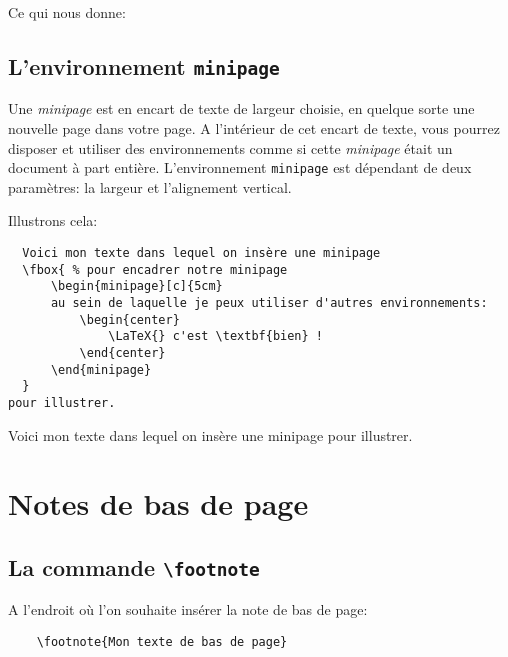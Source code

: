 Ce qui nous donne:
\begin{center}
\setlength{\fboxsep}{8mm}
\setlength{\fboxrule}{2mm}
\end{center}
\medskip

\subsection*{L'environnement \texttt{minipage}}
Une \textit{minipage} est en encart de texte de largeur choisie, en quelque sorte une nouvelle page dans votre page. A l'intérieur de cet encart de texte, vous pourrez disposer et utiliser des environnements comme si cette \textit{minipage} était un document à part entière. L'environnement \texttt{minipage} est dépendant de deux paramètres: la largeur et l'alignement vertical.
\medskip

Illustrons cela:
\begin{verbatim}
  Voici mon texte dans lequel on insère une minipage
  \fbox{ % pour encadrer notre minipage
	  \begin{minipage}[c]{5cm}
	  au sein de laquelle je peux utiliser d'autres environnements:
		  \begin{center}
			  \LaTeX{} c'est \textbf{bien} !
		  \end{center}
	  \end{minipage}
  }
pour illustrer.
\end{verbatim}
\medskip

Voici mon texte dans lequel on insère une minipage
pour illustrer.
\medskip

\section{Notes de bas de page}
\subsection*{La commande \texttt{\textbackslash footnote}}
A l'endroit où l'on souhaite insérer la note de bas de page:
\begin{verbatim}
    \footnote{Mon texte de bas de page}
\end{verbatim}
\medskip

